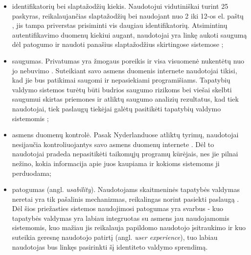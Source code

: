 \begin{itemize}
    \item identifikatorių bei slaptažodžių kiekis. Naudotojui vidutiniškai turint 25 paskyras, reikalaujančias slaptažodžių \cite{Florencio2007} bei naudojant
    nuo 2 iki 12-os el. paštų \cite{Gross2007}, jis tampa priverstas prisiminti vis daugiau identifikatorių. Atsimintinų autentifikavimo duomenų kiekiui
    augant, naudotojai yra linkę aukoti saugumą dėl patogumo ir naudoti panašius
    slaptažodžius skirtingose sistemose \cite{Pashalidis2003, Samar1999};
    \item saugumas. Privatumas yra žmogaus poreikis ir visa visuomenė nukentėtų nuo jo nebuvimo \cite{Maliki2007}.
    Suteikiant savo asmens duomenis internete naudotojai tikisi, kad jie bus patikimai
    saugomi ir nepasiekiami programišiams. Tapatybių valdymo sistemos turėtų būti budrios saugumo rizikoms bei viešai skelbti
    saugumui skirtas priemones ir atliktų saugumo analizių rezultatus, kad tiek naudotojai, tiek paslaugų tiekėjai
    galėtų pasitikėti tapatybių valdymo sistemomis \cite{Dhamija2008};
    \item asmens duomenų kontrolė. Pasak Nyderlanduose atliktų tyrimų, naudotojai nesijaučia kontroliuojantys savo asmens duomenų internete \cite{Baars2016}. Dėl to
    naudotojai pradeda nepasitikėti taikomųjų programų kūrėjais, nes jie pilnai nežino, kokia informacija apie juos kaupiama ir kokioms
    sistemoms ji perduodama;
    \item patogumas (angl. \textit{usability}). Naudotojams skaitmeninės tapatybės valdymas neretai yra tik pašalinis mechanizmas, reikalingas
    norint pasiekti paslaugą \cite{Dhamija2008}. Dėl šios priežasties sistemos naudojimosi patogumas yra svarbus - kuo tapatybės valdymas yra labiau integruotas
    su asmens jau naudojamomis sistemomis, kuo mažiau jis reikalauja papildomo naudotojo įsitraukimo ir kuo suteikia geresnę naudotojo patirtį (angl. \textit{user experience}), tuo labiau naudotojas bus linkęs pasirinkti šį identiteto valdymo sprendimą.
\end{itemize}



